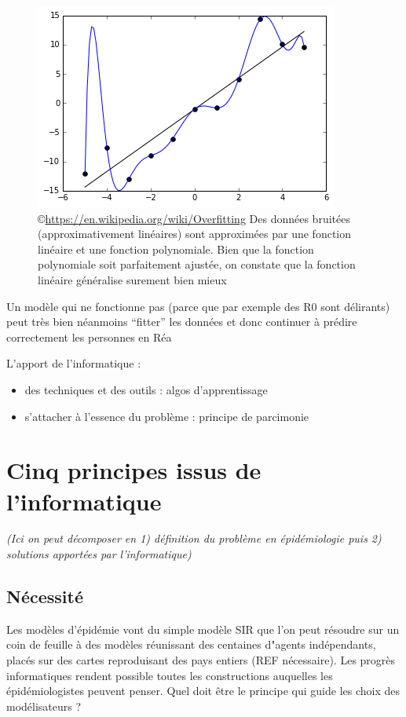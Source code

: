 \documentclass[review]{elsarticle}
\begin{document}
\begin{figure}[h]
  \includegraphics[width=0.8\linewidth]{Overfitted_Data.png}  
  \centering
  \caption{\copyright \href{wikipedia}{https://en.wikipedia.org/wiki/Overfitting}  Des données bruitées (approximativement linéaires) sont approximées par une fonction linéaire et une fonction polynomiale. Bien que la fonction polynomiale soit parfaitement ajustée, on constate que la fonction linéaire généralise surement bien mieux}
  \label{fig:overfitting}
\end{figure}


Un modèle qui ne fonctionne pas (parce que par exemple des R0 sont délirants) peut très bien néanmoins ``fitter'' les données  et donc continuer à prédire correctement les personnes en Réa


L'apport de l'informatique :
\begin{itemize}
\item des techniques et des outils : algos d'apprentissage
\item s'attacher à l'essence du problème : principe de parcimonie
\end{itemize}

\section{Cinq principes issus de l'informatique}

\textit{(Ici on peut décomposer en 1) définition du problème en épidémiologie puis 2) solutions apportées par l'informatique)}

\subsection{Nécessité}

Les modèles d'épidémie vont du simple modèle SIR que l'on peut résoudre sur un coin de feuille à des modèles réunissant des centaines d"agents indépendants, placés sur des cartes reproduisant des pays entiers (REF nécessaire). Les progrès informatiques rendent possible toutes les constructions auquelles les épidémiologistes peuvent penser. Quel doit être le principe qui guide les choix des modélisateurs ? 
\end{document}
